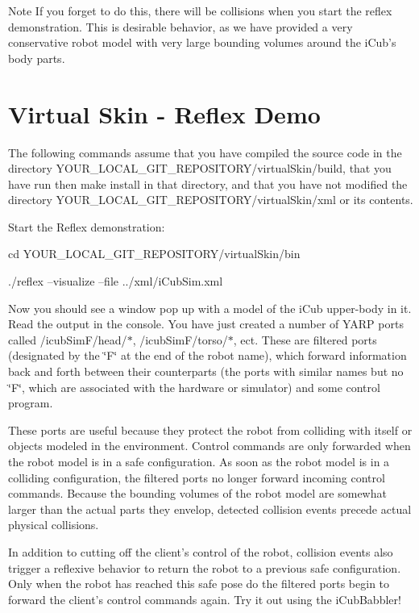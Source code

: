 \begin{DoxyNote}{Note}
If you forget to do this, there will be collisions when you start the reflex demonstration. This is desirable behavior, as we have provided a very conservative robot model with very large bounding volumes around the iCub's body parts.
\end{DoxyNote}
\hypertarget{reflex_demo_skin}{}\section{Virtual Skin -\/ Reflex Demo}\label{reflex_demo_skin}
The following commands assume that you have compiled the source code in the directory {\ttfamily YOUR\_\-LOCAL\_\-GIT\_\-REPOSITORY/virtualSkin/build}, that you have run  then {\ttfamily make} {\ttfamily install} in that directory, and that you have not modified the directory {\ttfamily YOUR\_\-LOCAL\_\-GIT\_\-REPOSITORY/virtualSkin/xml} or its contents.

Start the Reflex demonstration: \begin{DoxyVerb}cd YOUR_LOCAL_GIT_REPOSITORY/virtualSkin/bin \end{DoxyVerb}
 \begin{DoxyVerb}./reflex --visualize --file ../xml/iCubSim.xml \end{DoxyVerb}


Now you should see a window pop up with a model of the iCub upper-\/body in it. Read the output in the console. You have just created a number of YARP ports called {\ttfamily /icubSimF/head/$\ast$}, {\ttfamily /icubSimF/torso/$\ast$}, ect. These are filtered ports (designated by the \char`\"{}F\char`\"{} at the end of the robot name), which forward information back and forth between their counterparts (the ports with similar names but no \char`\"{}F\char`\"{}, which are associated with the hardware or simulator) and some control program.

These ports are useful because they protect the robot from colliding with itself or objects modeled in the environment. Control commands are only forwarded when the robot model is in a safe configuration. As soon as the robot model is in a colliding configuration, the filtered ports no longer forward incoming control commands. Because the bounding volumes of the robot model are somewhat larger than the actual parts they envelop, detected collision events precede actual physical collisions.

In addition to cutting off the client's control of the robot, collision events also trigger a reflexive behavior to return the robot to a previous safe configuration. Only when the robot has reached this safe pose do the filtered ports begin to forward the client's control commands again. Try it out using the iCubBabbler!

